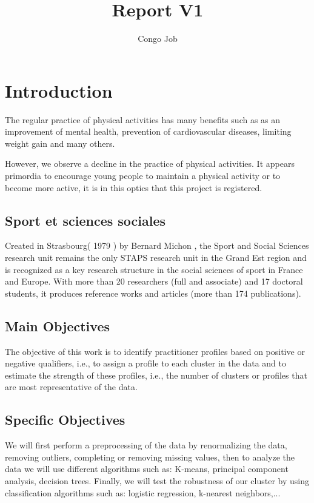 \documentclass[12pt]{article}
\title{Report V1}
\author{Congo Job}
\begin{document}
    \maketitle

\tableofcontents

\section{Introduction}
The regular practice of physical activities has many benefits such as 
as an improvement of mental health, prevention of cardiovascular diseases, limiting weight gain and many others. 

However, we observe a decline in the practice of physical activities.
It appears primordia to encourage young people to maintain a physical activity or to become more active, it is in this optics that this project is registered. 



\subsection{Sport et sciences sociales}

Created in Strasbourg( 1979 ) by Bernard Michon , the Sport and Social Sciences research unit
remains the only STAPS research unit in the Grand Est region and is recognized as a key research structure in the social sciences of sport in France and Europe.
With more than 20 researchers (full and associate) and 17 doctoral students, it produces reference works and articles (more than 174 publications).




\subsection{Main Objectives}

The objective of this work is to identify practitioner profiles based on positive or negative qualifiers, i.e., to assign a profile to each cluster in the data and to estimate the strength of these profiles, i.e., the number of clusters or profiles that are most representative of the data.


\subsection{Specific Objectives}
We will first perform a preprocessing of the data by renormalizing the data, removing outliers, completing or removing missing values, then to analyze the data we will use different algorithms such as: K-means, principal component analysis, decision trees. Finally, we will test the robustness of our cluster by using classification algorithms such as: logistic regression, k-nearest neighbors,...
\end{document}

